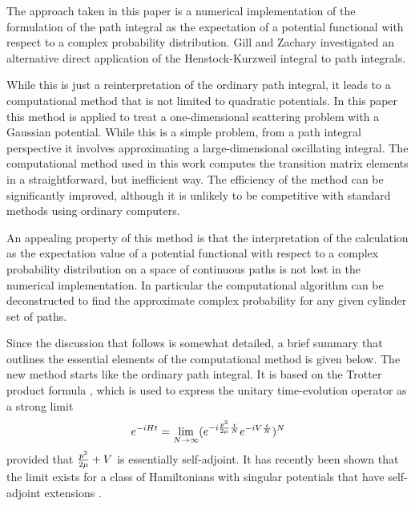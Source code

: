 \documentclass[aps,prc,reprint,noshowpacs,groupedaddress,onecolumn]{revtex4}
\def\beq{\begin{equation}}
\def\eeq{\end{equation}}
\begin{document}
The approach taken in this paper is a numerical implementation of the
formulation of the path integral as the expectation of a potential
functional with respect to a complex probability distribution.  Gill
and Zachary \cite{Gill} investigated an alternative direct application of the
Henstock-Kurzweil integral to path integrals.  

While this is just a reinterpretation of the ordinary path integral,
it leads to a computational method that is not limited to quadratic
potentials.  In this paper this method is applied to treat a
one-dimensional scattering problem with a Gaussian potential.  While
this is a simple problem, from a path integral perspective it involves
approximating a large-dimensional oscillating integral.  The
computational method used in this work computes the transition matrix
elements in a straightforward, but inefficient way.  The efficiency of
the method can be significantly improved, although it is unlikely to be
competitive with standard methods using ordinary computers.

An appealing property of this method is that the interpretation of the
calculation as the expectation value of a potential functional with
respect to a complex probability distribution on a space of continuous
paths is not lost in the numerical implementation.  In particular the
computational algorithm can be deconstructed to find the approximate
complex probability for any given cylinder set of paths.  

Since the discussion that follows is somewhat detailed, a brief
summary that outlines the essential elements of the computational
method is given below.  The new method starts like the ordinary path
integral.  It is based on the Trotter product formula \cite{Simon},
which is used to express the unitary time-evolution operator as a
strong limit
\beq
e^{-iHt} = \lim_{N \to \infty} (e^{-i {p^2\over2\mu}{t \over N} }e^{-iV{t \over N} })^N
\label{i.1}
\eeq
provided that ${{p}^2\over 2 \mu} +V$ is essentially self-adjoint.  It
has recently been shown that the limit exists for
a class of Hamiltonians with singular 
potentials that have self-adjoint extensions \cite{Katya_3}.
\end{document}
